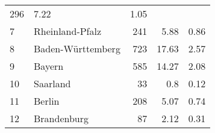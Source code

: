 \begin{longtable}{lXrrr}
       \num{296} &
       \num[round-mode=places,round-precision=2]{7.22} &
         \num[round-mode=places,round-precision=2]{1.05} \\

     7 &
     \multicolumn{1}{X}{ Rheinland-Pfalz   } &


       \num{241} &
       \num[round-mode=places,round-precision=2]{5.88} &
         \num[round-mode=places,round-precision=2]{0.86} \\

     8 &
     \multicolumn{1}{X}{ Baden-Württemberg   } &


       \num{723} &
       \num[round-mode=places,round-precision=2]{17.63} &
         \num[round-mode=places,round-precision=2]{2.57} \\

     9 &
     \multicolumn{1}{X}{ Bayern   } &


       \num{585} &
       \num[round-mode=places,round-precision=2]{14.27} &
         \num[round-mode=places,round-precision=2]{2.08} \\

     10 &
     \multicolumn{1}{X}{ Saarland   } &


       \num{33} &
       \num[round-mode=places,round-precision=2]{0.8} &
         \num[round-mode=places,round-precision=2]{0.12} \\

     11 &
     \multicolumn{1}{X}{ Berlin   } &


       \num{208} &
       \num[round-mode=places,round-precision=2]{5.07} &
         \num[round-mode=places,round-precision=2]{0.74} \\

     12 &
     \multicolumn{1}{X}{ Brandenburg   } &


       \num{87} &
       \num[round-mode=places,round-precision=2]{2.12} &
         \num[round-mode=places,round-precision=2]{0.31} \\


\end{longtable}
